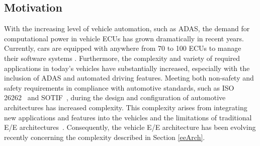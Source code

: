     \subsection{Motivation}\label{motiv}
    With the increasing level of vehicle automation, such as ADAS, the demand for computational power in vehicle ECUs has grown dramatically in recent years. Currently, cars are equipped with anywhere from 70 to 100 ECUs to manage their software systems \cite{pelliccione2017automotive}.
    Furthermore, the complexity and variety of required applications in today's vehicles have substantially increased, especially with the inclusion of ADAS and automated driving features. Meeting both non-safety and safety requirements in compliance with automotive standards, such as ISO 26262~\cite{iso26262} and SOTIF~\cite{sotif}, during the design and configuration of automotive architectures has increased complexity. This complexity arises from integrating new applications and features into the vehicles and the limitations of traditional E/E architectures~\cite{askaripoor2022architecture,askaripoor2023designer,9613692}. Consequently, the vehicle E/E architecture has been evolving recently concerning the complexity described in Section \ref{eeArch}.
    
    
    
    
    
